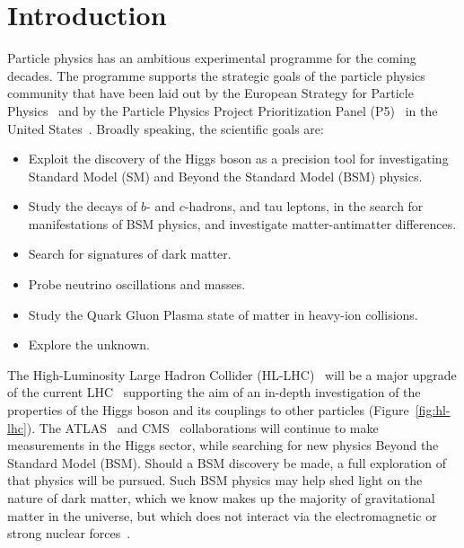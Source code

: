 

\hypertarget{introduction}{%
\section{Introduction}\label{introduction}}

Particle physics has an ambitious experimental programme for the
coming decades. The programme supports the strategic goals of the
particle physics community that have been laid out by the European
Strategy for Particle Physics~\cite{ESPP2013} and by
the Particle Physics Project Prioritization Panel (P5)~\cite{DOE-P5} in the United
States~\cite{2014pwa}. Broadly speaking, the
scientific goals are:

\begin{itemize}
\item Exploit the discovery of the Higgs boson as a precision tool
  for investigating Standard Model (SM) and Beyond the Standard Model
  (BSM) physics.
\item
  Study the decays of $b$- and $c$-hadrons, and tau leptons, in the search
  for manifestations of BSM physics, and investigate
  matter-antimatter differences.
\item
  Search for signatures of dark matter.
\item
  Probe neutrino oscillations and masses.
\item
  Study the Quark Gluon Plasma state of matter in heavy-ion collisions.
\item
  Explore the unknown.
\end{itemize}

The High-Luminosity Large Hadron Collider
(HL-LHC)~\cite{HL-LHC,1742-6596-515-1-012012,Apollinari:2284929} 
will be a major
upgrade of the current LHC~\cite{LHC} supporting the aim of 
an in-depth investigation of the properties of the Higgs boson and its
couplings to other particles (Figure~\ref{fig:hl-lhc}). The ATLAS~\cite{ATLAS} and CMS~\cite{CMS}
collaborations will continue to make measurements in the Higgs sector,
while searching for new physics Beyond the Standard Model (BSM). Should
a BSM discovery be made, a full exploration of that physics will be
pursued. Such BSM physics may help shed light on the nature of dark
matter, which we know makes up the majority of gravitational matter in
the universe, but which does not interact via the electromagnetic or
strong nuclear forces~\cite{Mangano2016}.


